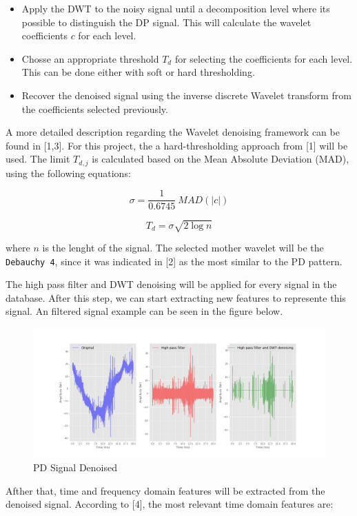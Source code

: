\documentclass[11pt]{article}
\makeatletter
\def\maxwidth{\ifdim\Gin@nat@width>\linewidth\linewidth
    \else\Gin@nat@width\fi}
\let\Oldincludegraphics\includegraphics
\renewcommand{\includegraphics}[1]{\Oldincludegraphics[width=.8\maxwidth]{#1}}
\providecommand{\tightlist}{%
      \setlength{\itemsep}{0pt}\setlength{\parskip}{0pt}}
\makeatother
\begin{document}
\begin{itemize}
\tightlist
\item
  Apply the DWT to the noisy signal until a decomposition level where
  its possible to distinguish the DP signal. This will calculate the
  wavelet coefficients \(c\) for each level.
\item
  Chosse an appropriate threshold \(T_{d}\) for selecting the
  coefficients for each level. This can be done either with soft or hard
  thresholding.
\item
  Recover the denoised signal using the inverse discrete Wavelet
  transform from the coefficients selected previously.
\end{itemize}

A more detailed description regarding the Wavelet denoising framework
can be found in {[}1,3{]}. For this project, the a hard-thresholding
approach from {[}1{]} will be used. The limit \(T_{d,j}\) is calculated
based on the Mean Absolute Deviation (MAD), using the following
equations:

\[\sigma = \frac{1}{0.6745}~MAD(|c|) \]

\[T_{d} = \sigma\sqrt{2\log{n}} \]

where \(n\) is the lenght of the signal. The selected mother wavelet
will be the \texttt{Debauchy\ 4}, since it was indicated in {[}2{]} as
the most similar to the PD pattern.

The high pass filter and DWT denoising will be applied for every signal
in the database. After this step, we can start extracting new features
to represente this signal. An filtered signal example can be seen in the
figure below.

\begin{figure}
\centering
\includegraphics{signal_phase_denoised.png}
\caption{PD Signal Denoised}
\end{figure}

Afther that, time and frequency domain features will be extracted from
the denoised signal. According to {[}4{]}, the most relevant time domain
features are:
\end{document}
